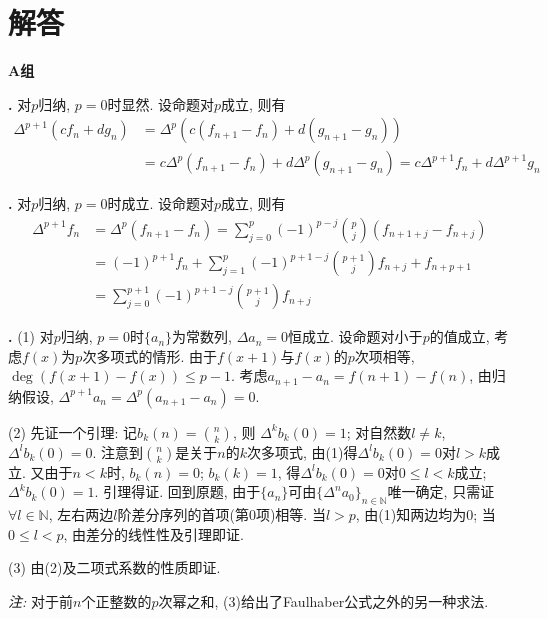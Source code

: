 \section*{解答}

\par \textbf{A组}
\par \textbf{\thesolseq .} \cite{IC} 对$p$归纳, $p=0$时显然. 设命题对$p$成立, 则有
\begin{align*}
    \Delta^{p+1} (cf_n+dg_n)&=\Delta^{p}(c(f_{n+1}-f_n)+d(g_{n+1}-g_n)) \\
    &=c\Delta^{p}(f_{n+1}-f_n)+d\Delta^{p}(g_{n+1}-g_n) = c\Delta^{p+1}f_n + d\Delta^{p+1} g_n
\end{align*}

\par \textbf{\thesolseq .} 对$p$归纳, $p=0$时成立. 设命题对$p$成立, 则有
\begin{align*}
    \Delta^{p+1} f_n &= \Delta^p (f_{n+1}- f_n)= \sum_{j=0}^p (-1)^{p-j}\binom{p}{j} (f_{n+1+j} - f_{n+j})\\
    &= (-1)^{p+1}f_n + \sum_{j=1}^p (-1)^{p+1-j}\binom{p+1}{j} f_{n+j} + f_{n+p+1}\\
    &= \sum_{j=0}^{p+1} (-1)^{p+1-j}\binom{p+1}{j} f_{n+j}
\end{align*}

\par \textbf{\thesolseq .} \cite{IC} (1) 对$p$归纳, $p=0$时$\{a_n\}$为常数列, $\Delta a_n=0$恒成立. 设命题对小于$p$的值成立, 考虑$f(x)$为$p$次多项式的情形. 由于$f(x+1)$与$f(x)$的$p$次项相等, $\operatorname{deg} (f(x+1)-f(x)) \le p-1$. 考虑$a_{n+1} - a_n=f(n+1)-f(n)$, 由归纳假设, $\Delta^{p+1} a_n=\Delta^p (a_{n+1} - a_n)=0$. 
\par (2) 先证一个引理: 记$b_k(n)=\binom{n}{k}$, 则 $\Delta^k b_k(0)=1$; 对自然数$l\neq k$, $\Delta^l b_k(0)=0$. 注意到$\binom{n}{k}$是关于$n$的$k$次多项式, 由(1)得$\Delta^l b_k(0)=0$对$l>k$成立. 又由于$n<k$时, $b_k(n)=0$; $b_k(k)=1$, 得$\Delta^l b_k(0)=0$对$0\le l<k$成立; $\Delta^k b_k(0)=1$. 引理得证. 回到原题, 由于$\{a_n\}$可由$\{\Delta^n a_0\}_{n\in \mathbb{N}}$唯一确定, 只需证$\forall l\in \mathbb{N}$, 左右两边$l$阶差分序列的首项(第0项)相等. 当$l>p$, 由(1)知两边均为0; 当$0\le l<p$, 由差分的线性性及引理即证. 
\par (3) 由(2)及二项式系数的性质即证. 
\par \emph{注:} 对于前$n$个正整数的$p$次幂之和, (3)给出了Faulhaber公式之外的另一种求法.

